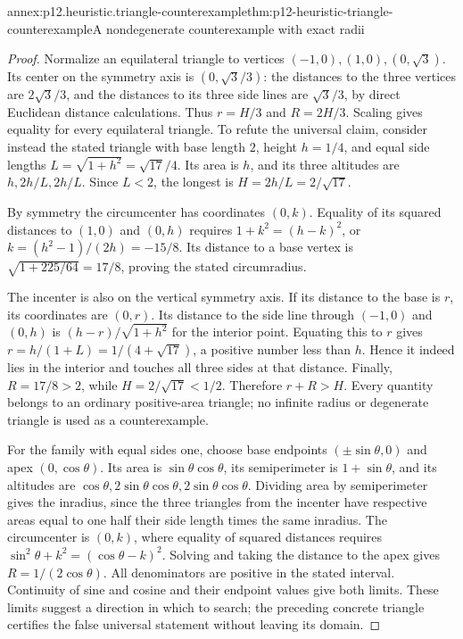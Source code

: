 \begin{annexitem}{annex:p12.heuristic.triangle-counterexample}{thm:p12-heuristic-triangle-counterexample}{A nondegenerate counterexample with exact radii}
\begin{proof}
Normalize an equilateral triangle to vertices \((-1,0),(1,0),
(0,\sqrt3)\). Its center on the symmetry axis is
\((0,\sqrt3/3)\): the distances to the three vertices are
\(2\sqrt3/3\), and the distances to its three side lines are
\(\sqrt3/3\), by direct Euclidean distance calculations.
Thus \(r=H/3\) and \(R=2H/3\). Scaling gives equality for
every equilateral triangle. To refute the universal
claim, consider instead the stated triangle with base length
\(2\), height \(h=1/4\), and equal side lengths
\(L=\sqrt{1+h^2}=\sqrt{17}/4\). Its area is \(h\), and
its three altitudes are \(h,2h/L,2h/L\). Since \(L<2\),
the longest is \(H=2h/L=2/\sqrt{17}\).

By symmetry the circumcenter has coordinates \((0,k)\).
Equality of its squared distances to \((1,0)\) and \((0,h)\)
requires \(1+k^2=(h-k)^2\), or
\(k=(h^2-1)/(2h)=-15/8\). Its distance to a base vertex is
\(\sqrt{1+225/64}=17/8\), proving the stated circumradius.

The incenter is also on the vertical symmetry axis. If its
distance to the base is \(r\), its coordinates are \((0,r)\).
Its distance to the side line through \((-1,0)\) and \((0,h)\)
is \((h-r)/\sqrt{1+h^2}\) for the interior point.
Equating this to \(r\) gives
\(r=h/(1+L)=1/(4+\sqrt{17})\), a positive number less than
\(h\). Hence it indeed lies in the interior and touches all
three sides at that distance. Finally, \(R=17/8>2\), while
\(H=2/\sqrt{17}<1/2\). Therefore \(r+R>H\).
Every quantity belongs to an ordinary positive-area triangle;
no infinite radius or degenerate triangle is used as a counterexample.

For the family with equal sides one, choose base endpoints
\((\pm\sin\theta,0)\) and apex \((0,\cos\theta)\).
Its area is \(\sin\theta\cos\theta\), its semiperimeter
is \(1+\sin\theta\), and its altitudes are
\(\cos\theta,2\sin\theta\cos\theta,2\sin\theta\cos\theta\).
Dividing area by semiperimeter gives the inradius, since the
three triangles from the incenter have respective areas equal
to one half their side length times the same inradius.
The circumcenter is \((0,k)\), where equality of squared
distances requires
\(\sin^2\theta+k^2=(\cos\theta-k)^2\).
Solving and taking the distance to the apex gives
\(R=1/(2\cos\theta)\). All denominators are positive in
the stated interval. Continuity of sine and cosine and their
endpoint values give both limits. These limits suggest a
direction in which to search; the preceding concrete triangle
certifies the false universal statement without leaving its domain.
\end{proof}
\end{annexitem}

